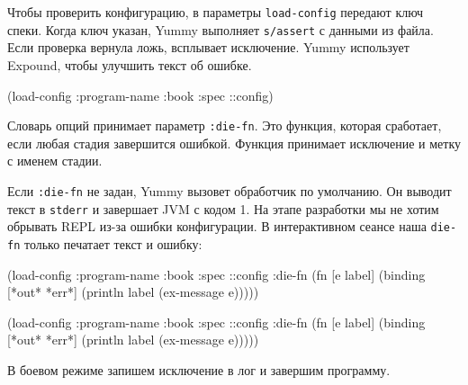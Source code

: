
Чтобы проверить конфигурацию, в параметры \verb|load-config| передают ключ
спеки. Когда ключ указан, Yummy выполняет \verb|s/assert| с данными из
файла. Если проверка вернула ложь, всплывает исключение. Yummy использует
Expound, чтобы улучшить текст об ошибке.

\begin{english}
  \begin{clojure}
(load-config {:program-name :book
              :spec ::config})
  \end{clojure}
\end{english}


\mnoindent
Словарь опций принимает параметр \verb|:die-fn|. Это функция, которая
сработает, если любая стадия завершится ошибкой. Функция принимает исключение
и метку с именем стадии.


Если \verb|:die-fn| не задан, Yummy вызовет обработчик по умолчанию. Он
выводит текст в \verb|stderr| и завершает JVM с кодом 1. На этапе разработки
мы не хотим обрывать REPL из-за ошибки конфигурации. В интерактивном сеансе
наша \verb|die-fn| только печатает текст и ошибку:

\ifnarrow

\begin{english}
  \begin{clojure}
(load-config
 {:program-name :book
  :spec ::config
  :die-fn (fn [e label]
            (binding [*out* *err*]
              (println label
                (ex-message e))))})
  \end{clojure}
\end{english}

\else

\begin{english}
  \begin{clojure}
(load-config
 {:program-name :book
  :spec ::config
  :die-fn (fn [e label]
            (binding [*out* *err*]
              (println label (ex-message e))))})
  \end{clojure}
\end{english}

\fi

\noindent
В боевом режиме запишем исключение в лог и завершим программу.


\ifnarrow

